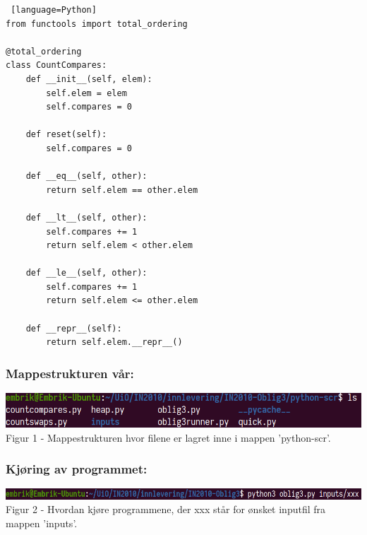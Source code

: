 \documentclass[a4paper, article, oneside, norsk]{memoir} %
\newcommand{\0}{\mathbf{0}}
\newcommand{\1}{\mathbf{1}}
\begin{document}
\begin{lstlisting} [language=Python]
from functools import total_ordering

@total_ordering
class CountCompares:
    def __init__(self, elem):
        self.elem = elem
        self.compares = 0

    def reset(self):
        self.compares = 0

    def __eq__(self, other):
        return self.elem == other.elem

    def __lt__(self, other):
        self.compares += 1
        return self.elem < other.elem

    def __le__(self, other):
        self.compares += 1
        return self.elem <= other.elem

    def __repr__(self):
        return self.elem.__repr__()
\end{lstlisting}

\subsubsection*{Mappestrukturen vår:}
\includegraphics[scale=0.5]{mappe.png}
\\
Figur 1 - Mappestrukturen hvor filene er lagret inne i mappen 'python-scr'.


\subsubsection*{Kjøring av programmet:}
\includegraphics[scale=0.4]{runfile.png}
\\
Figur 2 - Hvordan kjøre programmene, der xxx står for ønsket inputfil fra mappen 'inputs'.
\end{document}
